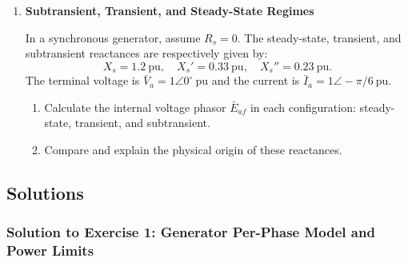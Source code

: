 \begin{enumerate}
    In a synchronous generator, assume $R_s = 0$ and $X_s = 1.2\ \text{pu}$. The terminal voltage is $\bar{V}_a = 1\angle 0^\circ\ \text{pu}$.
    The machine supplies a constant three-phase active power of $P_{3\phi} = 1.0\ \text{pu}$.
    \begin{enumerate}
        \item Calculate $\bar{I}_a$ such that the active power remains constant while the three-phase reactive power takes the values:
        \begin{enumerate}[(a)]
            \item $Q_{3\phi} = 0\ \text{pu}$
            \item $Q_{3\phi} = 0.5\ \text{pu}$
            \item $Q_{3\phi} = -0.5\ \text{pu}$
        \end{enumerate}
        \item For each configuration, show that $E_{af}\sin\delta$ remains constant.
        \item Sketch and explain the phasor diagrams corresponding to overexcited and underexcited operation.
    \end{enumerate}

    \item \textbf{Subtransient, Transient, and Steady-State Regimes}
    
    In a synchronous generator, assume $R_s = 0$. The steady-state, transient, and subtransient reactances are respectively given by:
    \[
    X_s = 1.2\ \text{pu},\quad X_s' = 0.33\ \text{pu},\quad X_s'' = 0.23\ \text{pu}.
    \]
    The terminal voltage is $\bar{V}_a = 1\angle 0^\circ\ \text{pu}$ and the current is $\bar{I}_a = 1\angle -\pi/6\ \text{pu}$.
    \begin{enumerate}
        \item Calculate the internal voltage phasor $\bar{E}_{af}$ in each configuration: steady-state, transient, and subtransient.
        \item Compare and explain the physical origin of these reactances.
    \end{enumerate}
\end{enumerate}

\newpage
\subsection{Solutions}

\subsubsection*{Solution to Exercise 1: Generator Per-Phase Model and Power Limits}
